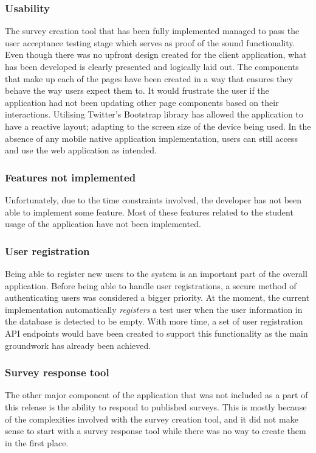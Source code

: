 \subsubsection*{Usability}
The survey creation tool that has been fully implemented managed to pass the user acceptance testing stage which serves as proof of 
the sound functionality.
Even though there was no upfront design created for the client application, what has been developed is clearly presented and logically laid
out.
The components that make up each of the pages have been created in a way that ensures they behave the way users expect them to.
It would frustrate the user if the application had not been updating other page components based on their interactions.
Utilising Twitter's Bootstrap library has allowed the application to have a reactive layout; adapting to the screen size of the device being used.
In the absence of any mobile native application implementation, users can still access and use the web application as intended.

\subsubsection{Features not implemented}
Unfortunately, due to the time constraints involved, the developer has not been able to implement some feature.
Most of these features related to the student usage of the application have not been implemented.

\subsubsection*{User registration}
Being able to register new users to the system is an important part of the overall application. 
Before being able to handle user registrations, a secure method of authenticating users was considered a bigger priority.  
At the moment, the current implementation automatically \emph{registers} a test user when the user information in the database is detected to be 
empty.
With more time, a set of user registration API endpoints would have been created to support this functionality as the main groundwork has already 
been achieved.

\subsubsection*{Survey response tool}
The other major component of the application that was not included as a part of this release is the ability to respond to published surveys.
This is mostly because of the complexities involved with the survey creation tool, and it did not make sense to start with a survey response tool
while there was no way to create them in the first place.

